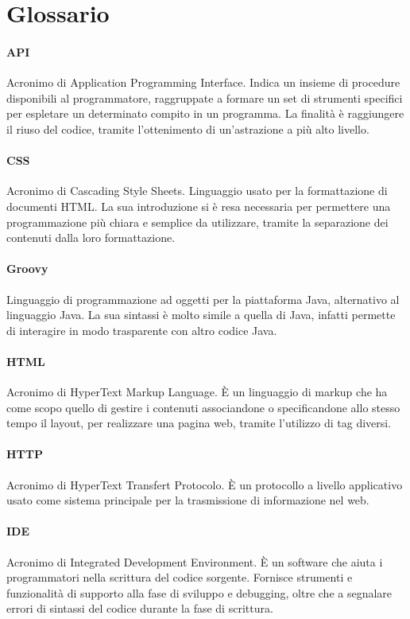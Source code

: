 \chapter*{Glossario}
    \subsubsection{\label{API}API}
      Acronimo di Application Programming Interface. Indica un insieme di procedure disponibili al programmatore, raggruppate a formare un set di strumenti specifici per espletare un determinato compito in un programma. La finalità è raggiungere il riuso del codice, tramite l'ottenimento di un'astrazione a più alto livello.
    \subsubsection{\label{CSS}CSS}
      Acronimo di Cascading Style Sheets. Linguaggio usato per la formattazione di documenti HTML. La sua introduzione si è resa necessaria per permettere una programmazione più chiara e semplice da utilizzare, tramite la separazione dei contenuti dalla loro formattazione.
    \subsubsection{\label{Groovy}Groovy}
      Linguaggio di programmazione ad oggetti per la piattaforma Java, alternativo al linguaggio Java. La sua sintassi è molto simile a quella di Java, infatti permette di interagire in modo trasparente con altro codice Java.
    \subsubsection{\label{HTML}HTML}
      Acronimo di HyperText Markup Language. È un linguaggio di markup che ha come scopo quello di gestire i contenuti associandone o specificandone allo stesso tempo il layout, per realizzare una pagina web, tramite l'utilizzo di tag diversi.
    \subsubsection{\label{HTTP}HTTP}
      Acronimo di HyperText Transfert Protocolo. È un protocollo a livello applicativo usato come sistema principale per la trasmissione di informazione nel web.
    \subsubsection{\label{IDE}IDE}
      Acronimo di Integrated Development Environment. È un software che aiuta i programmatori nella scrittura del codice sorgente. Fornisce strumenti e funzionalità di supporto alla fase di sviluppo e debugging, oltre che a segnalare errori di sintassi del codice durante la fase di scrittura.
